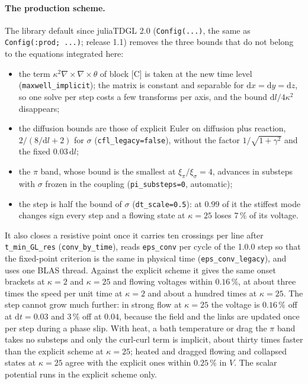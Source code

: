 \documentclass[11pt,a4paper]{article}
\newcommand{\code}[1]{\texttt{#1}}
\begin{document}
\paragraph{The production scheme.} The library default since juliaTDGL 2.0 (\code{Config(...)}, the same as
\code{Config(:prod; ...)}; release 1.1) removes
the three bounds that do not belong to the equations integrated here:
\begin{itemize}
\item the term $\kappa^2\nabla\times\nabla\times\theta$ of block [C] is taken
  at the new time level (\code{maxwell\_implicit}); the matrix is constant and
  separable for $\mathrm dx=\mathrm dy=\mathrm dz$, so one solve per step
  costs a few transforms per axis, and the bound $\mathrm dl/4\kappa^2$
  disappears;
\item the diffusion bounds are those of explicit Euler on diffusion plus
  reaction, $2/(8/\mathrm dl+2)$ for $\sigma$ (\code{cfl\_legacy=false}),
  without the factor $1/\sqrt{1+\gamma^2}$ and the fixed $0.03\,\mathrm dl$;
\item the $\pi$ band, whose bound is the smallest at $\xi_\pi/\xi_\sigma=4$,
  advances in substeps with $\sigma$ frozen in the coupling
  (\code{pi\_substeps=0}, automatic);
\item the step is half the bound of $\sigma$ (\code{dt\_scale=0.5}): at
  $0.99$ of it the stiffest mode changes sign every step and a flowing state
  at $\kappa=25$ loses $7\,\%$ of its voltage.
\end{itemize}
It also closes a resistive point once it carries ten crossings per line
after \code{t\_min\_GL\_res} (\code{conv\_by\_time}), reads \code{eps\_conv}
per cycle of the 1.0.0 step so that the fixed-point criterion is the same in
physical time (\code{eps\_conv\_legacy}), and uses one BLAS thread. Against
the explicit scheme it gives the same onset brackets at $\kappa=2$ and
$\kappa=25$ and flowing voltages within $0.16\,\%$, at about three times the
speed per unit time at $\kappa=2$ and about a hundred times at $\kappa=25$.
The step cannot grow much further: in strong flow at $\kappa=25$ the voltage
is $0.16\,\%$ off at $\mathrm dt=0.03$ and $3\,\%$ off at $0.04$, because the
field and the links are updated once per step during a phase slip. With heat,
a bath temperature or drag the $\pi$ band takes no substeps and only the
curl-curl term is implicit, about thirty times faster than the explicit scheme
at $\kappa=25$; heated and dragged flowing and collapsed states at $\kappa=25$
agree with the explicit ones within $0.25\,\%$ in $V$. The scalar potential
runs in the explicit scheme only.
\end{document}

